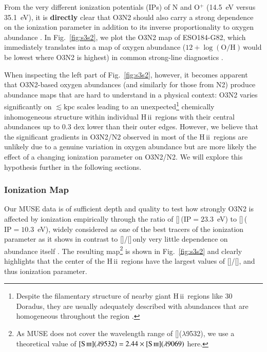 \documentclass[traditabstract, referee]{aa}
\newcommand{\hii}{\mbox{H\,{\sc ii}}}
\newcommand{\oh}{12+\log(\mathrm{O/H})}
\newcommand{\sii}{[\ion{S}{ii}]}
\newcommand{\siii}{[\ion{S}{iii}]}
\newcommand{\oii}{[\ion{O}{ii}]}
\newcommand{\oiii}{[\ion{O}{iii}]}
\begin{document}
From the very different ionization potentials (IPs) of N and O$^{+}$ (14.5~eV versus 35.1~eV), it is \textbf{directly} clear that O3N2 should also carry a strong dependence on the ionization parameter in addition to its inverse proportionality to oxygen abundance \citep[e.g.][]{1979A&A....78..200A, 2015MNRAS.448.2030H}. In Fig.~\ref{fig:s3s2}, we plot the O3N2 map of ESO184-G82, which immediately translates into a map of oxygen abundance ($\oh$\,would be lowest where O3N2 is highest) in common strong-line diagnostics \citep{2004MNRAS.348L..59P}.

When inspecting the left part of Fig.~\ref{fig:s3s2}, however, it becomes apparent that O3N2-based oxygen abundances (and similarly for those from N2) produce abundance maps that are hard to understand in a physical context: O3N2 varies significantly on $\lesssim\mathrm{kpc}$ scales leading to an unexpected\footnote{Despite the filamentary structure of nearby giant \hii~regions like 30 Doradus, they are usually adequately described with abundances that are homogeneous throughout the region \citep[e.g.][and references therein]{2011ApJ...738...34P}.} chemically inhomogeneous structure within individual \hii~regions with their central abundances up to 0.3 dex lower than their outer edges. However, we believe that the significant gradients in O3N2/N2 observed in most of the \hii~regions are unlikely due to a genuine variation in oxygen abundance but are more likely the effect of a changing ionization parameter on O3N2/N2. We will explore this hypothesis further in the following sections.

\subsubsection{Ionization Map}

Our MUSE data is of sufficient depth and quality to test how strongly O3N2 is affected by ionization empirically through the ratio of \siii\,($\mathrm{IP}=23.3$~eV) to \sii\,($\mathrm{IP}=10.3$~eV), widely considered as one of the best tracers of the ionization parameter \citep{1991MNRAS.253..245D} as it shows in contrast to \oiii/\oii\,only very little dependence on abundance itself \citep{2002ApJS..142...35K, 2011MNRAS.415.3616D}. The resulting map\footnote{As MUSE does not cover the wavelength range of \siii($\lambda$9532), we use a theoretical value of $\siii(\lambda9532)=2.44\times\siii(\lambda9069)$ \citep{1982MNRAS.199.1025M} here.} is shown in Fig.~\ref{fig:s3s2} and clearly highlights that the center of the \hii~regions have the largest values of \siii/\sii, and thus ionization parameter.
\end{document}
